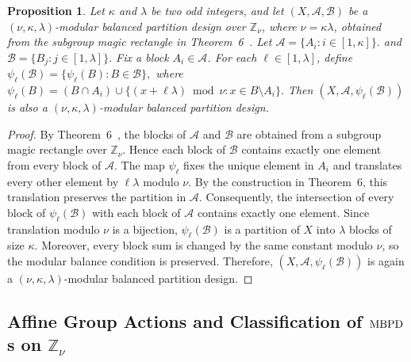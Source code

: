 \documentclass[preprint,11pt]{elsarticle}
\newcommand{\MBPD}{\textnormal{MBPD}}
\newtheorem{theorem}{Theorem}[section]
\newtheorem{proposition}[theorem]{Proposition}
\begin{document}
   
\begin{proposition}\label{prop:MBPDauto}
Let $\kappa$ and $\lambda$ be two odd integers, and let
$(X,\mathcal A,\mathcal B)$ be a
$(\nu,\kappa,\lambda)$-modular balanced partition design over
$\mathbb Z_{\nu}$, where $\nu=\kappa\lambda$, obtained from the subgroup
magic rectangle in \textnormal{Theorem~6~\cite{karthik2025existence}}. Let
\(
\mathcal A=\{A_i:i\in[1,\kappa]\}.
\) and \(
\mathcal B=\{B_j:j\in[1,\lambda]\}.
\)
Fix a block $A_i\in\mathcal A$. For each $\ell\in[1,\lambda]$, define
\(
\psi_\ell(\mathcal B)
=
\{\psi_\ell(B):B\in\mathcal B\},
\)
where
\(
\psi_\ell(B)
=
(B\cap A_i)\cup
\{(x+\ell\lambda)\bmod{\nu}:x\in B\setminus A_i\}.
\)
Then
\(
(X,\mathcal A,\psi_\ell(\mathcal B))
\)
is also a $(\nu,\kappa,\lambda)$-modular balanced partition design.
\end{proposition}
\begin{proof}
By Theorem~6~\cite{karthik2025existence}, the blocks of $\mathcal A$ and
$\mathcal B$ are obtained from a subgroup magic rectangle over
$\mathbb Z_{\nu}$. Hence each block of $\mathcal B$ contains exactly one
element from every block of $\mathcal A$.
The map $\psi_\ell$ fixes the unique element in $A_i$ and translates every
other element by $\ell\lambda$ modulo $\nu$. By the construction in
Theorem~6, this translation preserves the partition in $\mathcal A$.
Consequently, the intersection of every block of $\psi_\ell(\mathcal B)$ with each block of $\mathcal A$ contains exactly one element. Since translation modulo $\nu$ is a bijection, $\psi_\ell(\mathcal B)$ is a
partition of $X$ into $\lambda$ blocks of size $\kappa$. Moreover, every
block sum is changed by the same constant modulo $\nu$, so the modular
balance condition is preserved. Therefore,
$(X,\mathcal A,\psi_\ell(\mathcal B))$ is again a
$(\nu,\kappa,\lambda)$-modular balanced partition design.
\end{proof}
\subsection{Affine Group Actions and Classification of $\MBPD$s on $\mathbb Z_\nu$}
\end{document}
